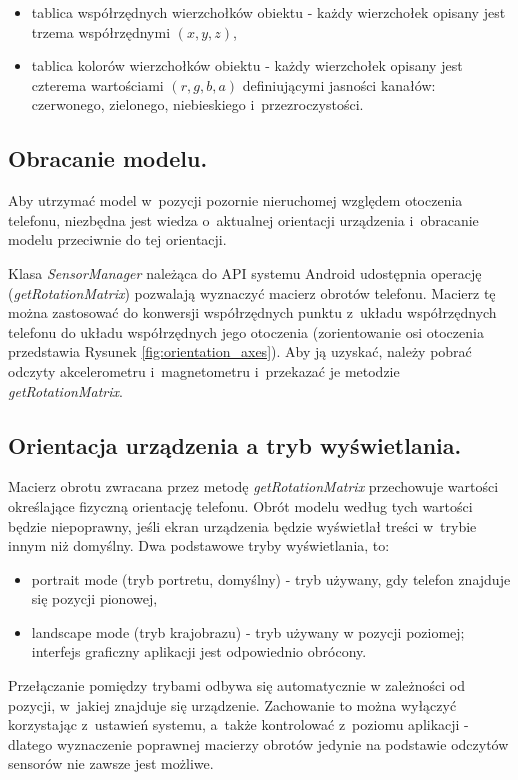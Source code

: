 \documentclass[a4paper,twocolumn,11pt]{article}
\begin{document}
 \begin{itemize}
  \item tablica współrzędnych wierzchołków obiektu - każdy wierzchołek opisany jest trzema współrzędnymi $(x, y, z)$,
  \item tablica kolorów wierzchołków obiektu - każdy wierzchołek opisany jest czterema wartościami $(r, g, b, a)$ definiującymi jasności kanałów: czerwonego, zielonego, niebieskiego i~przezroczystości.
 \end{itemize}


\subsection{Obracanie modelu.}
 Aby utrzymać model w~pozycji pozornie nieruchomej względem otoczenia telefonu, niezbędna jest wiedza o~aktualnej orientacji urządzenia i~obracanie modelu przeciwnie do tej orientacji.
 
 Klasa \emph{SensorManager} należąca do API systemu Android udostępnia operację (\emph{getRotationMatrix}) pozwalają wyznaczyć macierz obrotów telefonu.
 Macierz tę można zastosować do konwersji współrzędnych punktu z~układu współrzędnych telefonu do układu współrzędnych jego otoczenia (zorientowanie osi otoczenia przedstawia Rysunek \ref{fig:orientation_axes}).
 Aby ją uzyskać, należy pobrać odczyty akcelerometru i~magnetometru i~przekazać je metodzie \emph{getRotationMatrix}.


\subsection{Orientacja urządzenia a tryb wyświetlania.}
 Macierz obrotu zwracana przez metodę \emph{getRotationMatrix} przechowuje wartości określające fizyczną orientację telefonu.
 Obrót modelu według tych wartości będzie niepoprawny, jeśli ekran urządzenia będzie wyświetlał treści w~trybie innym niż domyślny.
 Dwa podstawowe tryby wyświetlania, to:
 \begin{itemize}
  \item portrait mode (tryb portretu, domyślny) - tryb używany, gdy telefon znajduje się pozycji pionowej,
  \item landscape mode (tryb krajobrazu) - tryb używany w pozycji poziomej; interfejs graficzny aplikacji jest odpowiednio obrócony.
 \end{itemize}
 
 Przełączanie pomiędzy trybami odbywa się automatycznie w zależności od pozycji, w~jakiej znajduje się urządzenie.
 Zachowanie to można wyłączyć korzystając z~ustawień systemu, a~także kontrolować z~poziomu aplikacji - dlatego wyznaczenie poprawnej macierzy obrotów jedynie na podstawie odczytów sensorów nie zawsze jest możliwe.
 
\end{document}
